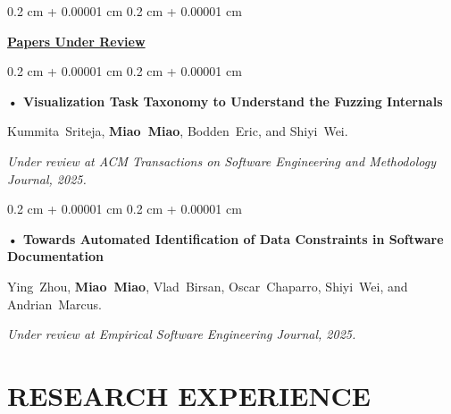 \documentclass[10pt, letterpaper]{article}
\newenvironment{onecolentry}{
    \begin{adjustwidth}{
        0.2 cm + 0.00001 cm
    }{
        0.2 cm + 0.00001 cm
    }
}{
    \end{adjustwidth}
} %
\begin{document}
            \vspace{0.20 cm}

            \begin{onecolentry}
                \textbf{\underline{Papers Under Review}}

            \end{onecolentry}

            \vspace{0.20 cm}
            
            \begin{onecolentry}
                \textbf{• Visualization Task Taxonomy to Understand the Fuzzing Internals}


                \mbox{Kummita Sriteja}, \mbox{\textbf{Miao Miao}}, \mbox{Bodden Eric}, and \mbox{Shiyi Wei}.
                
                
                \textit{Under review at ACM Transactions on Software Engineering and Methodology Journal, 2025.}
            \end{onecolentry}

            \vspace{0.20 cm}
            
            \begin{onecolentry}
                \textbf{• Towards Automated Identification of Data Constraints in Software Documentation}


                \mbox{Ying Zhou}, \mbox{\textbf{Miao Miao}}, \mbox{Vlad Birsan}, \mbox{Oscar Chaparro}, \mbox{Shiyi Wei}, and \mbox{Andrian Marcus}.
                
                
                \textit{Under review at Empirical Software Engineering Journal, 2025.}
            \end{onecolentry}


        
    \section{RESEARCH EXPERIENCE}
        
\end{document}
